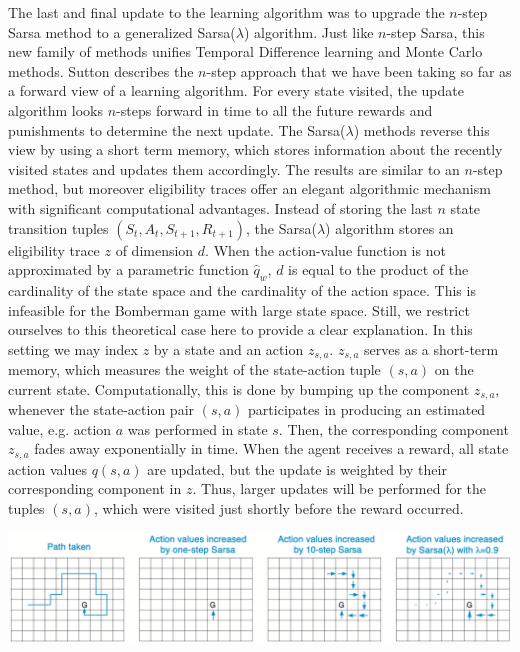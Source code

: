The last and final update to the learning algorithm was to upgrade the $n$-step Sarsa method to a generalized Sarsa($\lambda$) algorithm. Just like $n$-step Sarsa, this new family of methods unifies Temporal Difference learning and Monte Carlo methods. Sutton describes the $n$-step approach that we have been taking so far as a forward view of a learning algorithm. For every state visited, the update algorithm looks $n$-steps forward in time to all the future rewards and punishments to determine the next update. The Sarsa($\lambda$) methods reverse this view by using a short term memory, which stores information about the recently visited states and updates them accordingly. The results are similar to an $n$-step method, but moreover eligibility traces offer an elegant algorithmic mechanism with significant computational advantages. Instead of storing the last $n$ state transition tuples $(S_t, A_t, S_{t+1}, R_{t+1})$, the Sarsa($\lambda$) algorithm stores an eligibility trace $z$ of dimension $d$. When the action-value function is not approximated by a parametric function $\hat q_{w}$, $d$ is equal to the product of the cardinality of the state space and the cardinality of the action space. This is infeasible for the Bomberman game with large state space. Still, we restrict ourselves to this theoretical case here to provide a clear explanation. In this setting we may index $z$ by a state and an action $z_{s, a}$. $z_{s, a}$ serves as a short-term memory, which measures the weight of the state-action tuple $(s, a)$ on the current state. Computationally, this is done by bumping up the component $z_{s, a}$, whenever the state-action pair $(s, a)$ participates in producing an estimated value, e.g. action $a$ was performed in state $s$. Then, the corresponding component $z_{s, a}$ fades away exponentially in time. When the agent receives a reward, all state action values $q(s, a)$ are updated, but the update is weighted by their corresponding component in $z$. Thus, larger updates will be performed for the tuples $(s, a)$, which were visited just shortly before the reward occurred. 


\begin{center}
\begin{minipage}{\linewidth}
\includegraphics[scale=0.6]{graphics/sarsa_lambda.png}
\end{minipage}
\end{center}

